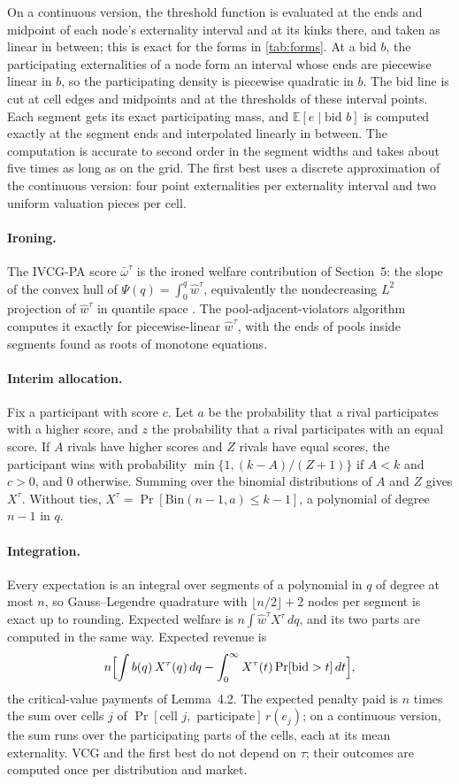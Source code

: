 \documentclass[11pt]{article}
\begin{document}
On a continuous version, the threshold function is evaluated at the ends and midpoint of each node's externality interval and at its kinks there, and taken as linear in between; this is exact for the forms in \cref{tab:forms}. At a bid $b$, the participating externalities of a node form an interval whose ends are piecewise linear in $b$, so the participating density is piecewise quadratic in $b$. The bid line is cut at cell edges and midpoints and at the thresholds of these interval points. Each segment gets its exact participating mass, and $\mathbb{E}[e\mid\text{bid }b]$ is computed exactly at the segment ends and interpolated linearly in between. The computation is accurate to second order in the segment widths and takes about five times as long as on the grid. The first best uses a discrete approximation of the continuous version: four point externalities per externality interval and two uniform valuation pieces per cell.

\paragraph{Ironing.} The IVCG-PA score $\bar\omega^\tau$ is the ironed welfare contribution of Section~5: the slope of the convex hull of $\Psi(q)=\int_0^q\hat w^\tau$, equivalently the nondecreasing $L^2$ projection of $\hat w^\tau$ in quantile space \citep{myerson_optimal_1981}. The pool-adjacent-violators algorithm computes it exactly for piecewise-linear $\hat w^\tau$, with the ends of pools inside segments found as roots of monotone equations.

\paragraph{Interim allocation.} Fix a participant with score $c$. Let $a$ be the probability that a rival participates with a higher score, and $z$ the probability that a rival participates with an equal score. If $A$ rivals have higher scores and $Z$ rivals have equal scores, the participant wins with probability $\min\{1,(k-A)/(Z+1)\}$ if $A<k$ and $c>0$, and $0$ otherwise. Summing over the binomial distributions of $A$ and $Z$ gives $X^\tau$. Without ties, $X^\tau=\Pr[\mathrm{Bin}(n-1,a)\leq k-1]$, a polynomial of degree $n-1$ in $q$.

\paragraph{Integration.} Every expectation is an integral over segments of a polynomial in $q$ of degree at most $n$, so Gauss--Legendre quadrature with $\lfloor n/2\rfloor+2$ nodes per segment is exact up to rounding. Expected welfare is $n\int\hat w^\tau X^\tau\,dq$, and its two parts are computed in the same way. Expected revenue is
\[
n\Bigl[\int b(q)\,X^\tau(q)\,dq-\int_0^{\infty}X^\tau(t)\Pr[\text{bid}>t]\,dt\Bigr],
\]
the critical-value payments of Lemma~4.2. The expected penalty paid is $n$ times the sum over cells $j$ of $\Pr[\text{cell }j,\text{ participate}]\,r(e_j)$; on a continuous version, the sum runs over the participating parts of the cells, each at its mean externality. VCG and the first best do not depend on $\tau$; their outcomes are computed once per distribution and market.
\end{document}
